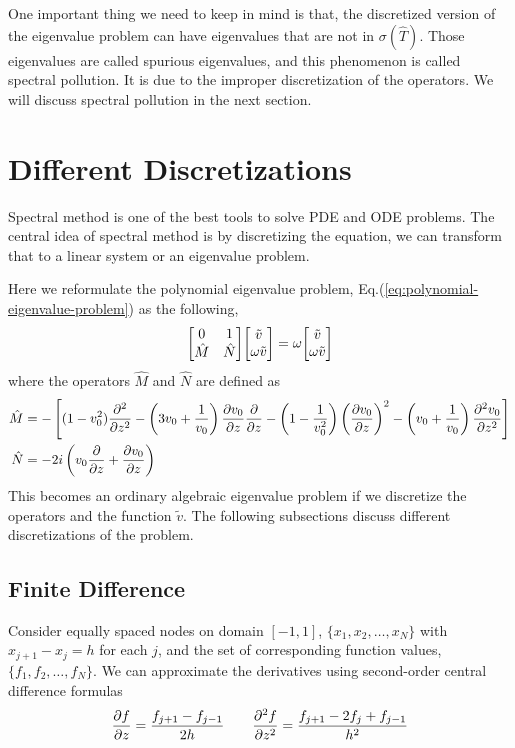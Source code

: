 One important thing we need to keep in mind is that, the discretized version of the eigenvalue problem can have eigenvalues that are not in $\sigma(\hat{T})$. Those eigenvalues are called spurious eigenvalues, and this phenomenon is called spectral pollution. It is due to the improper discretization of the operators. We will discuss spectral pollution in the next section.

\section{Different Discretizations}
Spectral method is one of the best tools to solve PDE and ODE problems. \cite{trefethen_spectral_2000} The central idea of spectral method is by discretizing the equation, we can transform that to a linear system or an eigenvalue problem.

Here we reformulate the polynomial eigenvalue problem, Eq.(\ref{eq:polynomial-eigenvalue-problem}) as the following,
\begin{equation} \label{eq:eigenvalue-problem}
	\mqty[ 0 & 1\\ \hat{M} & \hat{N} ]\mqty[ \tilde{v}\\ \omega \tilde{v}] = \omega\mqty[ \tilde{v}\\ \omega \tilde{v}]
\end{equation}
where the operators $\hat{M}$ and $\hat{N}$ are defined as
\begin{align*}
	\hat{M} & = -\left[(1-v_0^2)\pdv[2]{}{z}
		-\left(3v_0 + \frac{1}{v_0}\right)\pdv{v_0}{z}\pdv{}{z}
		- \left(1-\frac{1}{v_0^2}\right)\left(\pdv{v_0}{z}\right)^2
	- \left(v_0+\frac{1}{v_0}\right)\pdv[2]{v_0}{z}\right]  \\
	\hat{N} & = -2i\left(v_0\pdv{}{z} +\pdv{v_0}{z} \right)
\end{align*}
This becomes an ordinary algebraic eigenvalue problem if we discretize the operators and the function $\tilde{v}$. The following subsections discuss different discretizations of the problem.

\subsection{Finite Difference}
Consider equally spaced nodes on domain $[-1,1]$, $\{x_1, x_2, \dots, x_N\}$ with $x_{j+1}-x_{j} = h$ for each $j$, and the set of corresponding function values, $\{ f_1, f_2, \dots, f_N \}$. We can approximate the derivatives using second-order central difference formulas
\[
	\pdv{f}{z} = \frac{f_{j+1} - f_{j-1}}{2h}
	\qquad
	\pdv[2]{f}{z} = \frac{f_{j+1} -2f_{j} +f_{j-1}}{h^2}
\]

